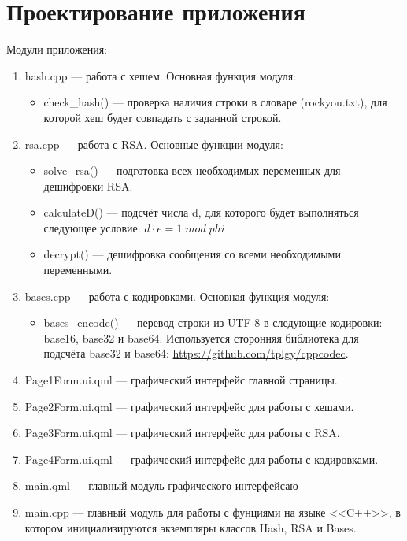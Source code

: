 \documentclass[a4paper,12pt]{article}
\begin{document}
\section{Проектирование приложения}
Модули приложения:
\begin{enumerate}
    \item hash.cpp --- работа с хешем. Основная функция модуля:
    \begin{itemize}
        \item check\_hash() --- проверка наличия строки в словаре (rockyou.txt), для которой хеш будет совпадать с заданной строкой.
    \end{itemize}
    \item rsa.cpp --- работа с RSA. Основные функции модуля:
    \begin{itemize}
        \item solve\_rsa() --- подготовка всех необходимых переменных для дешифровки RSA.
        \item calculateD() --- подсчёт числа d, для которого будет выполняться следующее условие: $d \cdot e = 1\; mod \; phi$
        \item decrypt() --- дешифровка сообщения со всеми необходимыми переменными.
    \end{itemize}
    \item bases.cpp --- работа с кодировками. Основная функция модуля:
    \begin{itemize}
        \item bases\_encode() --- перевод строки из UTF-8 в следующие кодировки: base16, base32 и base64. Используется сторонняя библиотека для подсчёта base32 и base64: \url{https://github.com/tplgy/cppcodec}.
    \end{itemize}
    \item Page1Form.ui.qml --- графический интерфейс главной страницы.
    \item Page2Form.ui.qml --- графический интерфейс для работы с хешами.
    \item Page3Form.ui.qml --- графический интерфейс для работы с RSA.
    \item Page4Form.ui.qml --- графический интерфейс для работы с кодировками.
    \item main.qml --- главный модуль графического интерфейсаю
    \item main.cpp --- главный модуль для работы с фунциями на языке <<C++>>, в котором инициализируются экземпляры классов Hash, RSA и Bases.
\end{enumerate}
\end{document}
